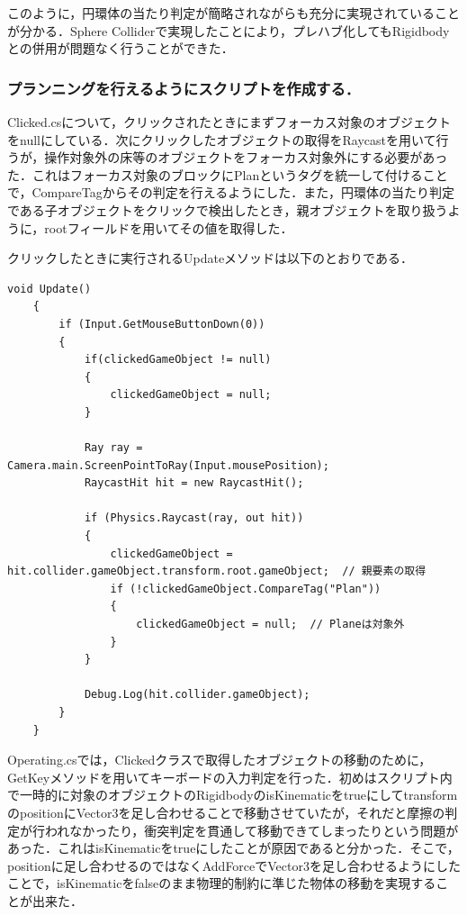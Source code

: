 \documentclass[12pt]{jarticle}
\begin{document}
このように，円環体の当たり判定が簡略されながらも充分に実現されていることが分かる．Sphere Colliderで実現したことにより，プレハブ化してもRigidbodyとの併用が問題なく行うことができた．

\subsubsection{プランニングを行えるようにスクリプトを作成する．}
Clicked.csについて，クリックされたときにまずフォーカス対象のオブジェクトをnullにしている．次にクリックしたオブジェクトの取得をRaycastを用いて行うが，操作対象外の床等のオブジェクトをフォーカス対象外にする必要があった．これはフォーカス対象のブロックにPlanというタグを統一して付けることで，CompareTagからその判定を行えるようにした．また，円環体の当たり判定である子オブジェクトをクリックで検出したとき，親オブジェクトを取り扱うように，rootフィールドを用いてその値を取得した．

クリックしたときに実行されるUpdateメソッドは以下のとおりである．

\begin{lstlisting}[caption=ClickedクラスのUpdateメソッド, label=clicked]
    void Update()
    {
        if (Input.GetMouseButtonDown(0))
        {
            if(clickedGameObject != null)
            {
                clickedGameObject = null;
            }

            Ray ray = Camera.main.ScreenPointToRay(Input.mousePosition);
            RaycastHit hit = new RaycastHit();

            if (Physics.Raycast(ray, out hit))
            {
                clickedGameObject = hit.collider.gameObject.transform.root.gameObject;  // 親要素の取得
                if (!clickedGameObject.CompareTag("Plan"))
                {
                    clickedGameObject = null;  // Planeは対象外
                }
            }

            Debug.Log(hit.collider.gameObject);
        }
    }
\end{lstlisting}

Operating.csでは，Clickedクラスで取得したオブジェクトの移動のために，GetKeyメソッドを用いてキーボードの入力判定を行った．初めはスクリプト内で一時的に対象のオブジェクトのRigidbodyのisKinematicをtrueにしてtransformのpositionにVector3を足し合わせることで移動させていたが，それだと摩擦の判定が行われなかったり，衝突判定を貫通して移動できてしまったりという問題があった．これはisKinematicをtrueにしたことが原因であると分かった．そこで，positionに足し合わせるのではなくAddForceでVector3を足し合わせるようにしたことで，isKinematicをfalseのまま物理的制約に準じた物体の移動を実現することが出来た．
\end{document}
